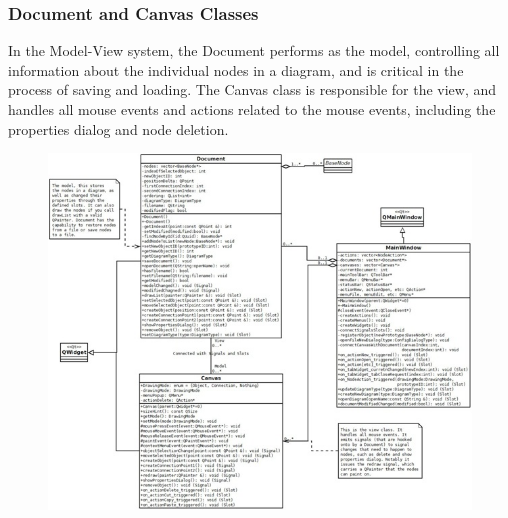 \documentclass[twoside,letterpaper]{article}
\begin{document}
{\subsubsection[\ Document and Canvas Classes ]
{\bfseries Document and Canvas Classes }
{
In the Model-View system, the Document performs as the model, controlling all information about the individual nodes in a diagram, and is critical in the process of saving and loading. \newline
The Canvas class is responsible for the view, and handles all mouse events and actions related to the mouse events, including the properties dialog and node deletion.
}
  \begin{figure}[h]
  \centering
  \includegraphics[width=6.5in]{class_documentcanvas.jpeg}
  \end{figure}

\clearpage
}
\end{document}
